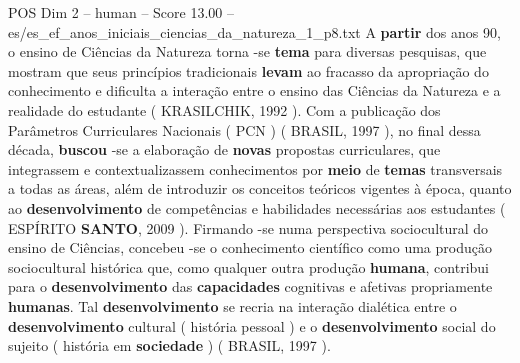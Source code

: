 \begin{textsample}{POS Dim 2 – human – Score 13.00 – es/es\_ef\_anos\_iniciais\_ciencias\_da\_natureza\_1\_p8.txt}  \label{ex:f2_pos_001}
A \textbf{partir} dos anos 90, o ensino de Ciências da Natureza torna -se \textbf{tema} para diversas pesquisas, que mostram que seus princípios tradicionais \textbf{levam} ao fracasso da apropriação do conhecimento e dificulta a interação entre o ensino das Ciências da Natureza e a realidade do estudante ( KRASILCHIK, 1992 ).
Com a publicação dos Parâmetros Curriculares Nacionais ( PCN ) ( BRASIL, 1997 ), no final dessa década, \textbf{buscou} -se a elaboração de \textbf{novas} propostas curriculares, que integrassem e contextualizassem conhecimentos por \textbf{meio} de \textbf{temas} transversais a todas as áreas, além de introduzir os conceitos teóricos vigentes à época, quanto ao \textbf{desenvolvimento} de competências e habilidades necessárias aos estudantes ( ESPÍRITO \textbf{SANTO}, 2009 ).
Firmando -se numa perspectiva sociocultural do ensino de Ciências, concebeu -se o conhecimento científico como uma produção sociocultural histórica que, como qualquer outra produção \textbf{humana}, contribui para o \textbf{desenvolvimento} das \textbf{capacidades} cognitivas e afetivas propriamente \textbf{humanas}.
Tal \textbf{desenvolvimento} se recria na interação dialética entre o \textbf{desenvolvimento} cultural ( história pessoal ) e o \textbf{desenvolvimento} social do sujeito ( história em \textbf{sociedade} ) ( BRASIL, 1997 ).

\end{textsample}
